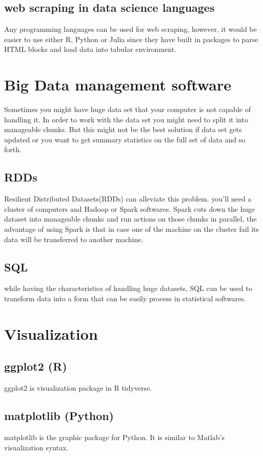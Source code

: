 \documentclass{article}
\begin{document}
\subsection{web scraping in data science languages}
Any programming languages can be used for web scraping, however, it would be easier to use either R, Python or Julia since they have built in packages to parse HTML blocks and load data into tabular environment.
\section{Big Data management software}
Sometimes you might have huge data set that your computer is not capable of handling it. In order to work with the data set you might need to split it into manageable chunks. But this might not be the best solution if data set gets updated or you want to get summary statistics on the full set of data and so forth.\\
\subsection{RDDs}
Resilient Distributed Datasets(RDDs) can alleviate this problem. you'll need a cluster of computers and Hadoop or Spark softwares. Spark cuts down the huge dataset into manageable chunks and run actions on those chunks in parallel, the advantage of using Spark is that in case one of the machine on the cluster fail its data will be transferred to another machine.\\
\subsection{SQL}
while having the characteristics of handling huge datasets, SQL can be used to transform data into a form that can be easily process in statistical softwares.
\section{Visualization}
\subsection{ggplot2 (R)}
ggplot2 is visualization package in R tidyverse.  
\subsection{matplotlib (Python)}
matplotlib is the graphic package for Python. It is similar to Matlab's visualization syntax. 
\end{document}
